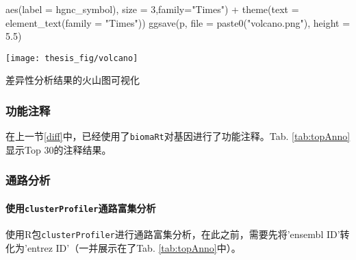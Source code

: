 \documentclass[
]{article}
\newenvironment{Shaded}{\begin{snugshade}}{\end{snugshade}}
\newcommand{\AttributeTok}[1]{\textcolor[rgb]{0.77,0.63,0.00}{#1}}
\newcommand{\DecValTok}[1]{\textcolor[rgb]{0.00,0.00,0.81}{#1}}
\newcommand{\FloatTok}[1]{\textcolor[rgb]{0.00,0.00,0.81}{#1}}
\newcommand{\FunctionTok}[1]{\textcolor[rgb]{0.00,0.00,0.00}{#1}}
\newcommand{\NormalTok}[1]{#1}
\newcommand{\SpecialCharTok}[1]{\textcolor[rgb]{0.00,0.00,0.00}{#1}}
\newcommand{\StringTok}[1]{\textcolor[rgb]{0.31,0.60,0.02}{#1}}
\begin{document}
\begin{Shaded}
\begin{Highlighting}[]
            \FunctionTok{aes}\NormalTok{(}\AttributeTok{label =}\NormalTok{ hgnc\_symbol),}
            \AttributeTok{size =} \DecValTok{3}\NormalTok{,}\AttributeTok{family=}\StringTok{"Times"}\NormalTok{) }\SpecialCharTok{+}
        \FunctionTok{theme}\NormalTok{(}\AttributeTok{text =} \FunctionTok{element\_text}\NormalTok{(}\AttributeTok{family =} \StringTok{"Times"}\NormalTok{))}
\FunctionTok{ggsave}\NormalTok{(p, }\AttributeTok{file =} \FunctionTok{paste0}\NormalTok{(}\StringTok{"volcano.png"}\NormalTok{), }\AttributeTok{height =} \FloatTok{5.5}\NormalTok{)}
\end{Highlighting}
\end{Shaded}

\bgroup {}
\texttt{[image: thesis\_fig/volcano]} \caption{差异性分析结果的火山图可视化}\label{fig:vol}
\makeatletter \egroup

\hypertarget{ux529fux80fdux6ce8ux91ca}{%
\subsubsection{功能注释}\label{ux529fux80fdux6ce8ux91ca}}

在上一节\ref{diff}中，已经使用了\texttt{biomaRt}对基因进行了功能注释。Tab. \ref{tab:topAnno}显示Top 30的注释结果。

\hypertarget{ux901aux8defux5206ux6790}{%
\subsubsection{通路分析}\label{ux901aux8defux5206ux6790}}

\hypertarget{ux4f7fux7528clusterprofilerux901aux8defux5bccux96c6ux5206ux6790}{%
\paragraph{\texorpdfstring{使用\texttt{clusterProfiler}通路富集分析}{使用clusterProfiler通路富集分析}}\label{ux4f7fux7528clusterprofilerux901aux8defux5bccux96c6ux5206ux6790}}

使用R包\texttt{clusterProfiler}进行通路富集分析，在此之前，需要先将'ensembl ID'转化为'entrez ID'（一并展示在了Tab. \ref{tab:topAnno}中）。
\end{document}
